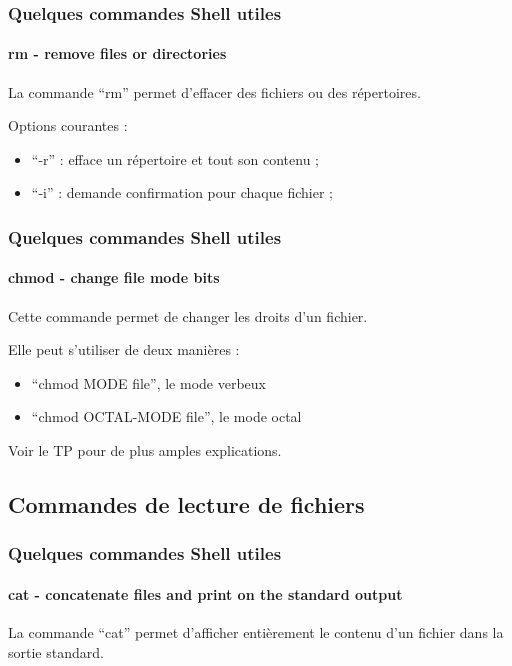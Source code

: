 \documentclass{beamer}
\begin{document}
            \begin{frame}
                \frametitle{Quelques commandes Shell utiles}
                \framesubtitle{rm - remove files or directories}
                La commande \foreignquote{french}{rm} permet d'effacer des fichiers ou des répertoires.
                
                Options courantes :
                \begin{itemize}
                    \item \foreignquote{french}{-r} : efface un répertoire et tout son contenu ;
                    \item \foreignquote{french}{-i} : demande confirmation pour chaque fichier ; 
                \end{itemize}
            \end{frame}
            
            \begin{frame}
                \frametitle{Quelques commandes Shell utiles}
                \framesubtitle{chmod - change file mode bits}
                Cette commande permet de changer les droits d'un fichier.
                
                Elle peut s'utiliser de deux manières :
                \begin{itemize}
                    \item \foreignquote{french}{chmod MODE file}, le mode verbeux
                    \item \foreignquote{french}{chmod OCTAL-MODE file}, le mode octal
                \end{itemize}
                
                Voir le TP pour de plus amples explications.
            \end{frame}
        
        \subsection[Commandes de lecture de fichiers]{Commandes de lecture de fichiers}
        
            \begin{frame}
                \frametitle{Quelques commandes Shell utiles}
                \framesubtitle{cat - concatenate files and print on the standard output}
                La commande \foreignquote{french}{cat} permet d'afficher entièrement le contenu d'un fichier dans la sortie standard.
            \end{frame}
            
\end{document}
